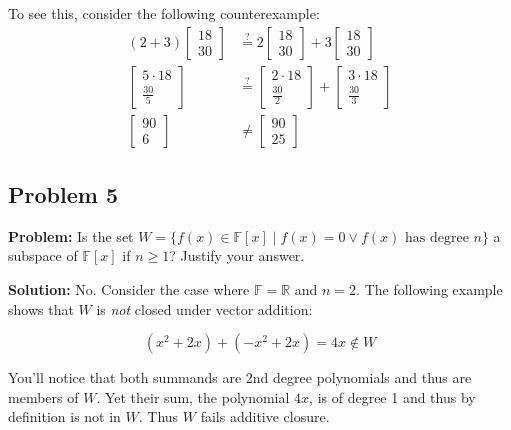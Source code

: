 \documentclass{article}
\begin{document}
To see this, consider the following counterexample:
\begin{align*}
    (2+3)\begin{bmatrix}
        18 \\
        30
    \end{bmatrix}&\stackrel{?}{=}2\begin{bmatrix}
        18 \\
        30
    \end{bmatrix}+3\begin{bmatrix}
        18 \\
        30
    \end{bmatrix}\\
    \begin{bmatrix}
        5\cdot18 \\
        \frac{30}{5}
    \end{bmatrix}&\stackrel{?}{=}\begin{bmatrix}
        2\cdot18 \\
        \frac{30}{2}
    \end{bmatrix}+\begin{bmatrix}
        3\cdot18 \\
        \frac{30}{3}
    \end{bmatrix}\\
    \begin{bmatrix}
        90 \\
        6
    \end{bmatrix}&\not=
    \begin{bmatrix}
        90 \\
        25
    \end{bmatrix}
\end{align*}

\subsection*{Problem 5}
\noindent\textbf{Problem:} Is the set $W = \{f(x)\in \mathbb F[x]\mid f(x) = 0 \vee f(x)\text{ has degree } n\}$ a subspace of $\mathbb F[x]$ if $n\ge 1$? Justify your answer.
\bigskip

\noindent\textbf{Solution:} No. Consider the case where $\mathbb F = \mathbb R$ and $n=2$. The following example shows that $W$ is \textit{not} closed under vector addition:

$$(x^2+2x)+(-x^2+2x)=4x\not\in W$$

You'll notice that both summands are 2nd degree polynomials and thus are members of $W$. Yet their sum, the polynomial $4x$, is of degree 1 and thus by definition is not in $W$. Thus $W$ fails additive closure.
\end{document}
